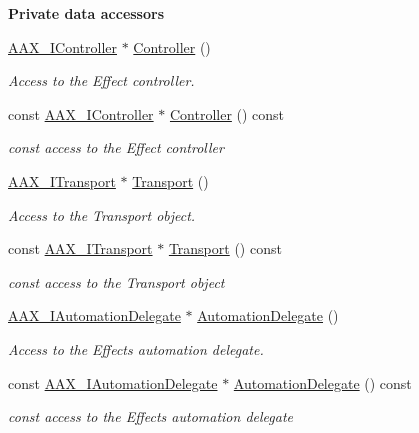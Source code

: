 \begin{Indent}{\bf Private data accessors}\par
\begin{DoxyCompactItemize}
\item 
\hyperlink{a00090}{A\+A\+X\+\_\+\+I\+Controller} $\ast$ \hyperlink{a00018_a2aad1f84d38b40fee029629c53273a56}{Controller} ()
\begin{DoxyCompactList}\small\item\em Access to the Effect controller. \end{DoxyCompactList}\item 
const \hyperlink{a00090}{A\+A\+X\+\_\+\+I\+Controller} $\ast$ \hyperlink{a00018_a9a03ffd16b2dab5f5b53eabf8e2a8556}{Controller} () const 
\begin{DoxyCompactList}\small\item\em {\ttfamily const} access to the Effect controller \end{DoxyCompactList}\item 
\hyperlink{a00116}{A\+A\+X\+\_\+\+I\+Transport} $\ast$ \hyperlink{a00018_af003e341f47eb1f170529db63066eca3}{Transport} ()
\begin{DoxyCompactList}\small\item\em Access to the Transport object. \end{DoxyCompactList}\item 
const \hyperlink{a00116}{A\+A\+X\+\_\+\+I\+Transport} $\ast$ \hyperlink{a00018_a08bda19fadbe73f041de99190e06e4c1}{Transport} () const 
\begin{DoxyCompactList}\small\item\em {\ttfamily const} access to the Transport object \end{DoxyCompactList}\item 
\hyperlink{a00086}{A\+A\+X\+\_\+\+I\+Automation\+Delegate} $\ast$ \hyperlink{a00018_ab88816d6dd3a86ae3db189e3b0d662b8}{Automation\+Delegate} ()
\begin{DoxyCompactList}\small\item\em Access to the Effect\textquotesingle{}s automation delegate. \end{DoxyCompactList}\item 
const \hyperlink{a00086}{A\+A\+X\+\_\+\+I\+Automation\+Delegate} $\ast$ \hyperlink{a00018_a8cfd9173a91c44533cb5bf2df97bda5f}{Automation\+Delegate} () const 
\begin{DoxyCompactList}\small\item\em {\ttfamily const} access to the Effect\textquotesingle{}s automation delegate \end{DoxyCompactList}\end{DoxyCompactItemize}
\end{Indent}
